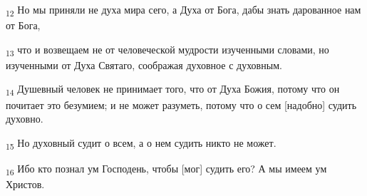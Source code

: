 \begin{tcolorbox}
\textsubscript{12} Но мы приняли не духа мира сего, а Духа от Бога, дабы знать дарованное нам от Бога,
\end{tcolorbox}
\begin{tcolorbox}
\textsubscript{13} что и возвещаем не от человеческой мудрости изученными словами, но изученными от Духа Святаго, соображая духовное с духовным.
\end{tcolorbox}
\begin{tcolorbox}
\textsubscript{14} Душевный человек не принимает того, что от Духа Божия, потому что он почитает это безумием; и не может разуметь, потому что о сем [надобно] судить духовно.
\end{tcolorbox}
\begin{tcolorbox}
\textsubscript{15} Но духовный судит о всем, а о нем судить никто не может.
\end{tcolorbox}
\begin{tcolorbox}
\textsubscript{16} Ибо кто познал ум Господень, чтобы [мог] судить его? А мы имеем ум Христов.
\end{tcolorbox}
